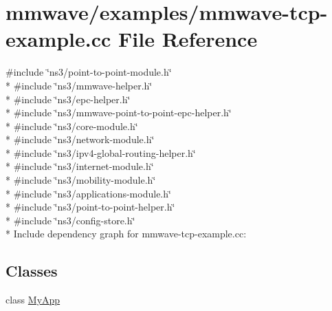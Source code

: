\hypertarget{mmwave-tcp-example_8cc}{}\section{mmwave/examples/mmwave-\/tcp-\/example.cc File Reference}
\label{mmwave-tcp-example_8cc}
{\ttfamily \#include \char`\"{}ns3/point-\/to-\/point-\/module.\+h\char`\"{}}\\*
{\ttfamily \#include \char`\"{}ns3/mmwave-\/helper.\+h\char`\"{}}\\*
{\ttfamily \#include \char`\"{}ns3/epc-\/helper.\+h\char`\"{}}\\*
{\ttfamily \#include \char`\"{}ns3/mmwave-\/point-\/to-\/point-\/epc-\/helper.\+h\char`\"{}}\\*
{\ttfamily \#include \char`\"{}ns3/core-\/module.\+h\char`\"{}}\\*
{\ttfamily \#include \char`\"{}ns3/network-\/module.\+h\char`\"{}}\\*
{\ttfamily \#include \char`\"{}ns3/ipv4-\/global-\/routing-\/helper.\+h\char`\"{}}\\*
{\ttfamily \#include \char`\"{}ns3/internet-\/module.\+h\char`\"{}}\\*
{\ttfamily \#include \char`\"{}ns3/mobility-\/module.\+h\char`\"{}}\\*
{\ttfamily \#include \char`\"{}ns3/applications-\/module.\+h\char`\"{}}\\*
{\ttfamily \#include \char`\"{}ns3/point-\/to-\/point-\/helper.\+h\char`\"{}}\\*
{\ttfamily \#include \char`\"{}ns3/config-\/store.\+h\char`\"{}}\\*
Include dependency graph for mmwave-\/tcp-\/example.cc\+:
\subsection*{Classes}
\begin{DoxyCompactItemize}
\item 
class \hyperlink{classMyApp}{My\+App}
\end{DoxyCompactItemize}
